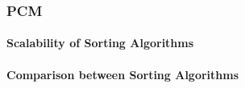 \subsubsection{PCM}

\paragraph{Scalability of Sorting Algorithms}
\paragraph{Comparison between Sorting Algorithms}

\clearpage